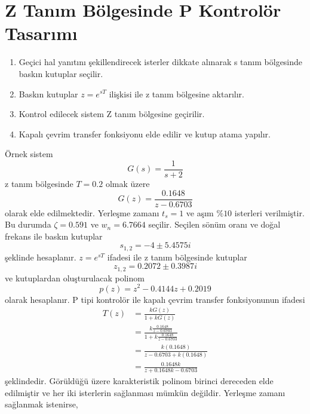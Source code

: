 \chapter{Z Tanım Bölgesinde P Kontrolör Tasarımı}
\begin{enumerate}
    \item Geçici hal yanıtını şekillendirecek isterler dikkate alınarak s tanım bölgesinde baskın kutuplar seçilir. 
    \item Baskın kutuplar $z=e^{sT}$ ilişkisi ile z tanım bölgesine aktarılır. 
    \item Kontrol edilecek sistem Z tanım bölgesine geçirilir. 
    \item Kapalı çevrim transfer fonksiyonu elde edilir ve kutup atama yapılır.
\end{enumerate}
Örnek sistem
\begin{equation}
    G(s)=\frac{1}{s+2}
\end{equation}
z tanım bölgesinde $T=0.2$ olmak üzere
\begin{equation}
    G(z)=\frac{0.1648}{z-0.6703}
\end{equation}
olarak elde edilmektedir. Yerleşme zamanı $t_s=1$ ve aşım $\%10$ isterleri verilmiştir. Bu durumda $\zeta=0.591$ ve $w_n=6.7664$ seçilir. Seçilen sönüm oranı ve doğal frekans ile baskın kutuplar
\begin{equation}
    s_{1,2}=-4 \pm 5.4575i
\end{equation}
şeklinde hesaplanır. $z=e^{sT}$ ifadesi ile z tanım bölgesinde kutuplar
\begin{equation}
    z_{1,2}=0.2072 \pm 0.3987i
\end{equation}
ve kutuplardan oluşturulacak polinom
\begin{equation}
    p(z)=z^2-0.4144 z+0.2019
\end{equation}
olarak hesaplanır. P tipi kontrolör ile kapalı çevrim transfer fonksiyonunun ifadesi
\begin{equation}
\begin{split}
    T(z)&=\frac{kG(z)}{1+kG(z)}\\
    &=\frac{k\frac{0.1648}{z-0.6703}}{1+k\frac{0.1648}{z-0.6703}}\\
    &=\frac{k(0.1648)}{z-0.6703+k(0.1648)}\\
    &=\frac{0.1648k}{z+0.1648k-0.6703}
\end{split}
\end{equation}
şeklindedir. Görüldüğü üzere karakteristik polinom birinci dereceden elde edilmiştir ve her iki isterlerin sağlanması mümkün değildir. Yerleşme zamanı sağlanmak istenirse,
